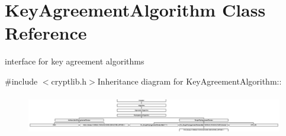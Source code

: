 \hypertarget{class_key_agreement_algorithm}{
\section{KeyAgreementAlgorithm Class Reference}
\label{class_key_agreement_algorithm}
}


interface for key agreement algorithms  


{\ttfamily \#include $<$cryptlib.h$>$}Inheritance diagram for KeyAgreementAlgorithm::\begin{figure}[H]
\begin{center}
\leavevmode
\includegraphics[height=1.77778cm]{class_key_agreement_algorithm}
\end{center}
\end{figure}
